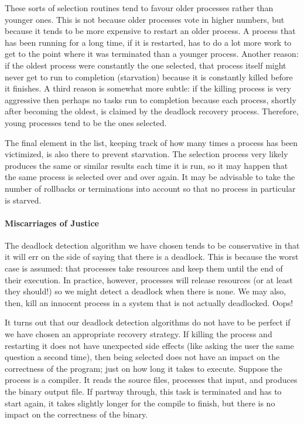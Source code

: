 These sorts of selection routines tend to favour older processes rather than younger ones. This is not because older processes vote in higher numbers, but because it tends to be more expensive to restart an older process. A process that has been running for a long time, if it is restarted, has to do a lot more work to get to the point where it was terminated than a younger process. Another reason: if the oldest process were constantly the one selected, that process itself might never get to run to completion (starvation) because it is constantly killed before it finishes. A third reason is somewhat more subtle: if the killing process is very aggressive then perhaps no tasks run to completion because each process, shortly after becoming the oldest, is claimed by the deadlock recovery process. Therefore, young processes tend to be the ones selected.

The final element in the list, keeping track of how many times a process has been victimized, is also there to prevent starvation. The selection process very likely produces the same or similar results each time it is run, so it may happen that the same process is selected over and over again. It may be advisable to take the number of rollbacks or terminations into account so that no process in particular is starved.

\paragraph{Miscarriages of Justice}
The deadlock detection algorithm we have chosen tends to be conservative in that it will err on the side of saying that there is a deadlock. This is because the worst case is assumed: that processes take resources and keep them until the end of their execution. In practice, however, processes will release resources (or at least they should!) so we might detect a deadlock when there is none. We may also, then, kill an innocent process in a system that is not actually deadlocked. Oops!

It turns out that our deadlock detection algorithms do not have to be perfect if we have chosen an appropriate recovery strategy. If killing the process and restarting it does not have unexpected side effects (like asking the user the same question a second time), then being selected does not have an impact on the correctness of the program; just on how long it takes to execute. Suppose the process is a compiler. It reads the source files, processes that input, and produces the binary output file. If partway through, this task is terminated and has to start again, it takes slightly longer for the compile to finish, but there is no impact on the correctness of the binary.

